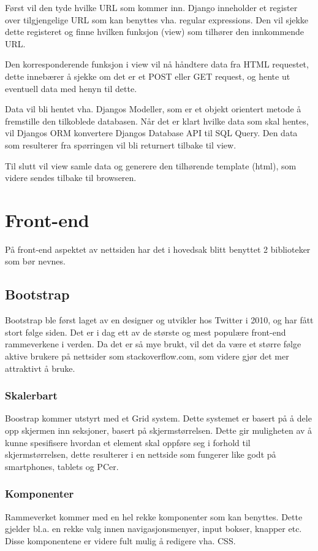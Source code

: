 Først vil den tyde hvilke URL som kommer inn. Django inneholder et register over tilgjengelige URL som kan benyttes vha. regular expressions. Den vil sjekke dette registeret og finne hvilken funksjon (view) som tilhører den innkommende URL.

Den korresponderende funksjon i view vil nå håndtere data fra HTML requestet, dette innebærer å sjekke om det er et POST eller GET request, og hente ut eventuell data med henyn til dette. 

Data vil bli hentet vha. Djangos Modeller, som er et objekt orientert metode å fremstille den tilkoblede databasen. Når det er klart hvilke data som skal hentes, vil Djangos ORM konvertere Djangos Database API til SQL Query. Den data som resulterer fra spørringen vil bli returnert tilbake til view.

Til slutt vil view samle data og generere den tilhørende template (html), som videre sendes tilbake til browseren.



\section{Front-end}
På front-end aspektet av nettsiden har det i hovedsak blitt benyttet 2 biblioteker som bør nevnes.  

\subsection{Bootstrap}
Bootstrap ble først laget av en designer og utvikler hos Twitter i 2010, og har fått stort følge siden. Det er i dag ett av de største og mest populære front-end rammeverkene i verden. Da det er så mye brukt, vil det da være et større følge aktive brukere på nettsider som stackoverflow.com, som videre gjør det mer attraktivt å bruke.

\subsubsection{Skalerbart}
Boostrap kommer utstyrt med et Grid system. Dette systemet er basert på å dele opp skjermen inn seksjoner, basert på skjermstørrelsen. Dette gir muligheten av å kunne spesifisere hvordan et element skal oppføre seg i forhold til skjermstørrelsen, dette resulterer i en nettside som fungerer like godt på smartphones, tablets og PCer.

\subsubsection{Komponenter}
Rammeverket kommer med en hel rekke komponenter som kan benyttes.  Dette gjelder bl.a. en rekke valg innen navigasjonsmenyer, input bokser, knapper etc. Disse komponentene er videre fult mulig å redigere vha. CSS.


